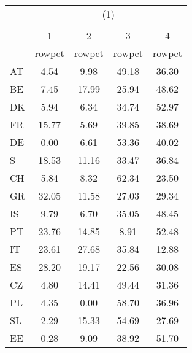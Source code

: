 {
\def\sym#1{\ifmmode^{#1}\else\(^{#1}\)\fi}
\begin{tabular}{l*{4}{c}}
\hline\hline
            &\multicolumn{4}{c}{(1)}                            \\
            &\multicolumn{4}{c}{}                               \\
            &           1&           2&           3&           4\\
            &      rowpct&      rowpct&      rowpct&      rowpct\\
\hline
AT          &        4.54&        9.98&       49.18&       36.30\\
BE          &        7.45&       17.99&       25.94&       48.62\\
DK          &        5.94&        6.34&       34.74&       52.97\\
FR          &       15.77&        5.69&       39.85&       38.69\\
DE          &        0.00&        6.61&       53.36&       40.02\\
S           &       18.53&       11.16&       33.47&       36.84\\
CH          &        5.84&        8.32&       62.34&       23.50\\
GR          &       32.05&       11.58&       27.03&       29.34\\
IS          &        9.79&        6.70&       35.05&       48.45\\
PT          &       23.76&       14.85&        8.91&       52.48\\
IT          &       23.61&       27.68&       35.84&       12.88\\
ES          &       28.20&       19.17&       22.56&       30.08\\
CZ          &        4.80&       14.41&       49.44&       31.36\\
PL          &        4.35&        0.00&       58.70&       36.96\\
SL          &        2.29&       15.33&       54.69&       27.69\\
EE          &        0.28&        9.09&       38.92&       51.70\\
\hline\hline
\end{tabular}
}
